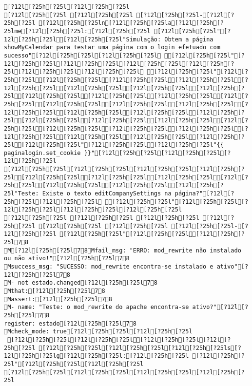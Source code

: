 \documentclass{scrartcl}
\begin{document}
\begin{Verbatim}
[?12l[?25h[?25l[?12l[?25h[?25l
[?12l[?25h[?25l [?12l[?25h[?25l [?12l[?25h[?25l-[?12l[?25h[?25l [?12l[?25h[?25ln[?12l[?25h[?25la[?12l[?25h[?25lme[?12l[?25h[?25l:[?12l[?25h[?25l [?12l[?25h[?25l"[?12l[?25h[?25l[?12l[?25h[?25l"Simulação: Obtem a página showMyCalendar para testar uma página com o login efetuado com sucesso"[?12l[?25h[?25l[?12l[?25h[?25l [?12l[?25h[?25l"[?12l[?25h[?25l[?12l[?25h[?25l[?12l[?25h[?25l[?12l[?25h[?25l[?12l[?25h[?25l[?12l[?25h[?25l [?12l[?25h[?25l"[?12l[?25h[?25l[?12l[?25h[?25l[?12l[?25h[?25l[?12l[?25h[?25l[?12l[?25h[?25l[?12l[?25h[?25l[?12l[?25h[?25l[?12l[?25h[?25l[?12l[?25h[?25l[?12l[?25h[?25l[?12l[?25h[?25l[?12l[?25h[?25l[?12l[?25h[?25l[?12l[?25h[?25l[?12l[?25h[?25l[?12l[?25h[?25l[?12l[?25h[?25l[?12l[?25h[?25l[?12l[?25h[?25l[?12l[?25h[?25l[?12l[?25h[?25l[?12l[?25h[?25l[?12l[?25h[?25l[?12l[?25h[?25l[?12l[?25h[?25l[?12l[?25h[?25l[?12l[?25h[?25l[?12l[?25h[?25l[?12l[?25h[?25l[?12l[?25h[?25l[?12l[?25h[?25l"[?12l[?25h[?25l[?12l[?25h[?25l"{{ paginalogin.set_cookie }}"[?12l[?25h[?25l[?12l[?25h[?25l[?12l[?25h[?25l
[?12l[?25h[?25l[?12l[?25h[?25l[?12l[?25h[?25l[?12l[?25h[?25l[?12l[?25h[?25l[?12l[?25h[?25l[?12l[?25h[?25l[?12l[?25h[?25l[?12l[?25h[?25l[?12l[?25h[?25l[?12l[?25h[?25l"Teste: Existe o texto editCompanySettings na página?"[?12l[?25h[?25l[?12l[?25h[?25l [?12l[?25h[?25l"[?12l[?25h[?25l[?12l[?25h[?25l[?12l[?25h[?25l[?12l[?25h[?25l
[?12l[?25h[?25l [?12l[?25h[?25l [?12l[?25h[?25l [?12l[?25h[?25l [?12l[?25h[?25l [?12l[?25h[?25l [?12l[?25h[?25l-[?12l[?25h[?25l [?12l[?25h[?25l"[?12l[?25h[?25l[?12l[?25h[?25l78
M[?12l[?25h[?25l78Mfail_msg: "ERRO: mod_rewrite não instalado ou não ativo!"[?12l[?25h[?25l78
Msuccess_msg: "SUCESSO: mod_rewrite encontra-se instalado e ativo"[?12l[?25h[?25l78
M- not estado.changed[?12l[?25h[?25l78
Mthat:[?12l[?25h[?25l78
Massert:[?12l[?25h[?25l78
M- name: "Teste: o mod_rewrite do apache encontra-se ativo?"[?12l[?25h[?25l78
register: estado[?12l[?25h[?25l78
Mcheck_mode: true[?12l[?25h[?25l[?12l[?25h[?25l
 [?12l[?25h[?25l[?12l[?25h[?25l[?12l[?25h[?25l[?12l[?25h[?25l [?12l[?25h[?25l[?12l[?25h[?25l[?12l[?25h[?25ls[?12l[?25h[?25lg[?12l[?25h[?25l:[?12l[?25h[?25l [?12l[?25h[?25l"[?12l[?25h[?25l[?12l[?25h[?25l
[?12l[?25h[?25l[?12l[?25h[?25l[?12l[?25h[?25l[?12l[?25h[?25l

\end{Verbatim}
\end{document}
